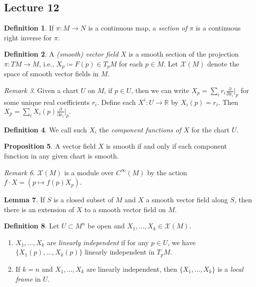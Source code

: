 \documentclass[10pt,letterpaper,cm]{nupset}
\theoremstyle{definition}
\newtheorem{definition}{Definition}[subsection]
\theoremstyle{theorem}
\newtheorem{lemma}[definition]{Lemma}
\newtheorem{prop}[definition]{Proposition}
\theoremstyle{remark}
\newtheorem{remark}[definition]{Remark}
\newcommand{\R}{\mathbb R}
\newcommand{\1}{\mathbf{1}}
\newcommand{\0}{\vec 0}
\begin{document}
\subsection{Lecture 12}

\begin{definition}
If $\pi : M \to N$ is a continuous map, a \textit{section of $\pi$} is a continuous right inverse for $\pi$.
\end{definition}

\begin{definition}
A \textit{(smooth) vector field} $X$ is a smooth section of the projection $\pi : TM \to M$, i.e., $X_p\coloneqq  F(p) \in T_pM$ for each $p \in M$. 
Let $\mathscr{X}(M)$ denote the space of smooth vector fields in $M$.
\end{definition}

\begin{remark}
Given a chart $U$ on $M$, if $p\in U$, then we can write $X_p = \sum_i r_i \frac{\partial}{\partial x_i}\rvert_p$ for some unique real coefficients $r_i$. Define each $X^i : U \to \R$ by $X_i(p) = r_i$. Then $X_p = \sum_i X_i(p) \frac{\partial}{\partial x_i}\rvert_p.$
\end{remark}

\begin{definition}
We call such $X_i$ the \textit{component functions of $X$} for the chart $U$.
\end{definition}

\begin{prop}
A vector field $X$ is smooth if and only if each component function in any given chart is smooth.
\end{prop}

\begin{remark}
$\mathscr{X}(M)$ is a module over $C^{\infty}(M)$ by the action $f \cdot X = (p \mapsto f(p)X_p)$.
\end{remark}

\begin{lemma}
If $S$ is a closed subset of $M$ and $X$ a smooth vector field along $S$, then there is an extension of $X$ to a smooth vector field on $M$.
\end{lemma}

\begin{definition} Let $U \subset M^n$ be open and $X_1, \ldots, X_k \in \mathscr{X}(M)$. 
\begin{enumerate}
\item  $X_1, \ldots, X_k$ are \textit{linearly independent} if for any $p\in U$, we have $\{X_1(p), \ldots, X_k(p)\}$ linearly independent in $T_pM$.
\item If $k=n$ and $X_1, \ldots, X_k$ are linearly independent, then $\{X_1, \ldots, X_k\}$ is a \textit{local frame} in $U$.
\end{enumerate}
\end{definition}
\end{document}
